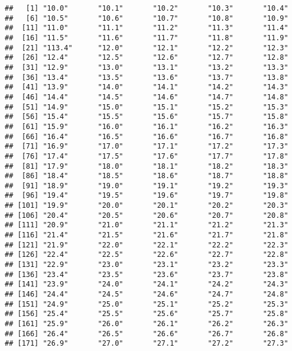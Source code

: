 \documentclass[
]{article}
\begin{document}
\begin{verbatim}
##   [1] "10.0"       "10.1"       "10.2"       "10.3"       "10.4"      
##   [6] "10.5"       "10.6"       "10.7"       "10.8"       "10.9"      
##  [11] "11.0"       "11.1"       "11.2"       "11.3"       "11.4"      
##  [16] "11.5"       "11.6"       "11.7"       "11.8"       "11.9"      
##  [21] "113.4"      "12.0"       "12.1"       "12.2"       "12.3"      
##  [26] "12.4"       "12.5"       "12.6"       "12.7"       "12.8"      
##  [31] "12.9"       "13.0"       "13.1"       "13.2"       "13.3"      
##  [36] "13.4"       "13.5"       "13.6"       "13.7"       "13.8"      
##  [41] "13.9"       "14.0"       "14.1"       "14.2"       "14.3"      
##  [46] "14.4"       "14.5"       "14.6"       "14.7"       "14.8"      
##  [51] "14.9"       "15.0"       "15.1"       "15.2"       "15.3"      
##  [56] "15.4"       "15.5"       "15.6"       "15.7"       "15.8"      
##  [61] "15.9"       "16.0"       "16.1"       "16.2"       "16.3"      
##  [66] "16.4"       "16.5"       "16.6"       "16.7"       "16.8"      
##  [71] "16.9"       "17.0"       "17.1"       "17.2"       "17.3"      
##  [76] "17.4"       "17.5"       "17.6"       "17.7"       "17.8"      
##  [81] "17.9"       "18.0"       "18.1"       "18.2"       "18.3"      
##  [86] "18.4"       "18.5"       "18.6"       "18.7"       "18.8"      
##  [91] "18.9"       "19.0"       "19.1"       "19.2"       "19.3"      
##  [96] "19.4"       "19.5"       "19.6"       "19.7"       "19.8"      
## [101] "19.9"       "20.0"       "20.1"       "20.2"       "20.3"      
## [106] "20.4"       "20.5"       "20.6"       "20.7"       "20.8"      
## [111] "20.9"       "21.0"       "21.1"       "21.2"       "21.3"      
## [116] "21.4"       "21.5"       "21.6"       "21.7"       "21.8"      
## [121] "21.9"       "22.0"       "22.1"       "22.2"       "22.3"      
## [126] "22.4"       "22.5"       "22.6"       "22.7"       "22.8"      
## [131] "22.9"       "23.0"       "23.1"       "23.2"       "23.3"      
## [136] "23.4"       "23.5"       "23.6"       "23.7"       "23.8"      
## [141] "23.9"       "24.0"       "24.1"       "24.2"       "24.3"      
## [146] "24.4"       "24.5"       "24.6"       "24.7"       "24.8"      
## [151] "24.9"       "25.0"       "25.1"       "25.2"       "25.3"      
## [156] "25.4"       "25.5"       "25.6"       "25.7"       "25.8"      
## [161] "25.9"       "26.0"       "26.1"       "26.2"       "26.3"      
## [166] "26.4"       "26.5"       "26.6"       "26.7"       "26.8"      
## [171] "26.9"       "27.0"       "27.1"       "27.2"       "27.3"      

\end{verbatim}
\end{document}

